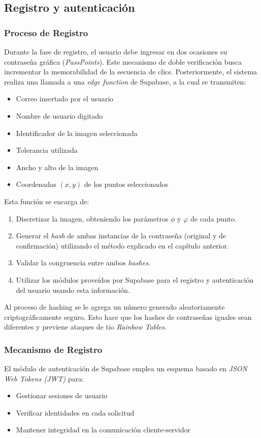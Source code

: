 \subsection{Registro y autenticaci\'on}
\subsubsection{Proceso de Registro}
Durante la fase de registro, el usuario debe ingresar en dos ocasiones su contraseña gráfica (\textit{PassPoints}). Este mecanismo de doble verificación busca incrementar la memorabilidad de la secuencia de clics. Posteriormente, el sistema realiza una llamada a una \textit{edge function} de Supabase, a la cual se transmiten:

\begin{itemize}
	\item Correo insertado por el usuario
	\item Nombre de usuario digitado
	\item Identificador de la imagen seleccionada
	\item Tolerancia utilizada 
	\item Ancho y alto de la imagen
	\item Coordenadas $(x,y)$ de los puntos seleccionados
\end{itemize}

Esta función se encarga de: 
\begin{enumerate}
	\item Discretizar la imagen, obteniendo los parámetros $\phi$  y $\varphi$ de cada punto.
	\item Generar el \textit{hash} de ambas instancias de la contraseña (original y de confirmación) utilizando el m\'etodo explicado en el cap\'itulo anterior.
	\item Validar la congruencia entre ambos \textit{hashes}.
	\item Utilizar los m\'odulos prove\'idos por Supabase para el registro y autenticaci\'on del usuario usando esta informaci\'on.
\end{enumerate}

Al proceso de hashing se le agrega un n\'umero generado aleatoriamente criptogr\'aficamente seguro. Esto hace que los hashes de contrase\~nas iguales sean diferentes y previene ataques de tio \textit{Rainbow Tables}.

\subsubsection{Mecanismo de Registro}
El módulo de autenticación de Supabase emplea un esquema basado en \textit{JSON Web Tokens (JWT)} para:
\begin{itemize}
	\item Gestionar sesiones de usuario
	\item Verificar identidades en cada solicitud
	\item Mantener integridad en la comunicación cliente-servidor
\end{itemize}

